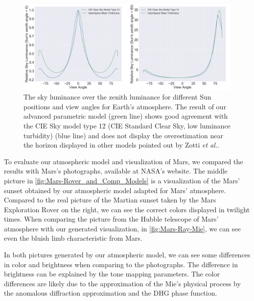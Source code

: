 \documentclass[journal]{vgtc}                %
\newcommand{\joncomment}[1]{\textbf{[JC~} \textcolor{red}{#1} \textbf{~]}}
\newcommand{\etal}{\emph{et al.}}
\newcommand{\review}[1]{{\color{blue}#1}}
\begin{document}
\begin{figure}
  \centering
  \includegraphics[width=\linewidth]{figures/validation-smaller.png}
  \vspace*{-7mm}
  \caption{The sky luminance over the zenith luminance for different Sun positions and view angles for Earth's atmosphere. The result of our advanced parametric model (green line) shows good agreement with the CIE Sky model type 12 (CIE Standard Clear Sky, low luminance turbidity) (blue line) and does not display the overestimation near the horizon displayed in other models \review{\cite{BrunetonNeyret:2008, Preetham:1999} pointed out by Zotti \etal \cite{Zotti:2007}}.}
  \label{fig:validation_curves}
  \vspace*{-6mm}
\end{figure}


\review {
To evaluate our atmospheric model and visualization of Mars, we compared the results with Mars's photographs, available at NASA's website. The middle picture in \autoref{fig:Mars-Rover_and_Comp_Models} is a visualization of the Mars' sunset obtained by our atmospheric model adapted for Mars' atmosphere. Compared to the real picture of the Martian sunset taken by the Mars Exploration Rover on the right, we can see the correct colors displayed in twilight times. When comparing the picture from the Hubble telescope of Mars' atmosphere with our generated visualization, in \autoref{fig:Mars-Ray-Mie}, we can see even the bluish limb characteristic from Mars.

In both pictures generated by our atmospheric model, we can see some differences in color and brightness when comparing to the photographs. The difference in brightness can be explained by the tone mapping parameters.  The color differences are likely due to the approximation of the Mie's physical process by the anomalous diffraction approximation and the DHG phase function.
}
\end{document}
